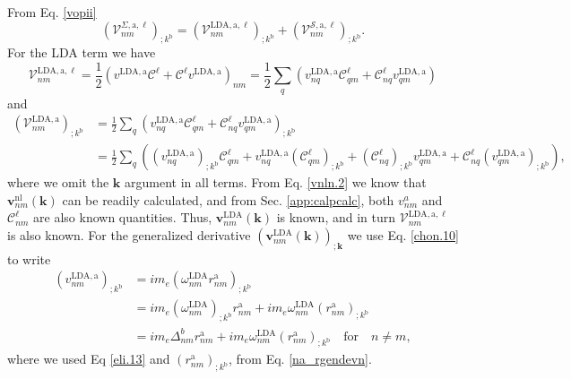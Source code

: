 From Eq. \eqref{vopii}
\begin{equation}\label{a.1}
\left(\mathcal{V}^{\Sigma,\mathrm{a},\ell}_{nm}\right)_{;k^\mathrm{b}}
= \left(\mathcal{V}^{\mathrm{LDA},\mathrm{a},\ell}_{nm}\right)_{;k^\mathrm{b}}
+ \left(\mathcal{V}^{{\mathcal{S}},\mathrm{a},\ell}_{nm}\right)_{;k^\mathrm{b}}.
\end{equation} 
For the LDA term we have
\begin{equation}\label{a.2}
\mathcal{V}^{\mathrm{LDA},\mathrm{a},\ell}_{nm}
= \frac{1}{2}
\left(v^{\mathrm{LDA},\mathrm{a}}\mathcal{C}^{\ell}
      + \mathcal{C}^{\ell} v^{\mathrm{LDA},\mathrm{a}}\right)_{nm} 
= \frac{1}{2}\sum_{q}
\left(
  v^{\mathrm{LDA},\mathrm{a}}_{nq}\mathcal{C}^{\ell}_{qm}
+ \mathcal{C}^{\ell}_{nq} v^{\mathrm{LDA},\mathrm{a}}_{qm}
\right)
\end{equation}
and
\begin{align}\label{a.2a}
\left(\mathcal{V}^{\mathrm{LDA},\mathrm{a}}_{nm}\right)_{;k^\mathrm{b}}
&= \frac{1}{2}\sum_{q}\left(  
  v^{\mathrm{LDA},\mathrm{a}}_{nq}\mathcal{C}^{\ell}_{qm}
+ \mathcal{C}^{\ell}_{nq}v^{\mathrm{LDA},\mathrm{a}}_{qm}
\right)_{;k^\mathrm{b}}\nonumber\\
&= \frac{1}{2}\sum_{q}\left(
  (v^{\mathrm{LDA},\mathrm{a}}_{nq})_{;k^\mathrm{b}}\mathcal{C}^{\ell}_{qm}
+  v^{\mathrm{LDA},\mathrm{a}}_{nq}(\mathcal{C}^{\ell}_{qm})_{;k^\mathrm{b}}
+ (\mathcal{C}^{\ell}_{nq})_{;k^\mathrm{b}} v^{\mathrm{LDA},\mathrm{a}}_{qm}
+ \mathcal{C}^{\ell}_{nq} (v^{\mathrm{LDA},\mathrm{a}}_{qm})_{;k^\mathrm{b}}
\right),
\end{align}   
where we omit the $\mathbf{k}$ argument in all terms. From Eq. \eqref{vnln.2} we
know that $\mathbf{v}^\mathrm{nl}_{nm}(\mathbf{k})$ can be readily calculated,
and from Sec. \ref{app:calpcalc}, both $v^{a}_{nm}$ and $\mathcal{C}_{nm}^{\ell}$
are also known quantities. Thus, $\mathbf{v}^\mathrm{LDA}_{nm}(\mathbf{k})$ is
known, and in turn $\mathcal{V}^{\mathrm{LDA},\mathrm{a},\ell}_{nm}$ is also
known. For the generalized derivative
$(\mathbf{v}^\mathrm{LDA}_{nm}(\mathbf{k}))_{;\mathbf{k}}$ we use Eq.
\eqref{chon.10} to write
\begin{align}\label{a.3}
(v^{\mathrm{LDA},\mathrm{a}}_{nm})_{;k^\mathrm{b}}
&= im_{e}(\omega^\mathrm{LDA}_{nm}r^\mathrm{a}_{nm})_{;k^\mathrm{b}}\nonumber\\
&= im_{e}(\omega^\mathrm{LDA}_{nm})_{;k^\mathrm{b}} r^\mathrm{a}_{nm}
 + im_{e}\omega^\mathrm{LDA}_{nm}(r^\mathrm{a}_{nm})_{;k^\mathrm{b}}\nonumber\\
&= im_{e}\Delta^b_{nm}r^\mathrm{a}_{nm}
 + im_{e}\omega^\mathrm{LDA}_{nm}(r^\mathrm{a}_{nm})_{;k^\mathrm{b}}
   \quad\mathrm{for}\quad n\ne m,
\end{align} 
where we used Eq \eqref{eli.13} and $(r^\mathrm{a}_{nm})_{;k^\mathrm{b}}$, from
Eq. \eqref{na_rgendevn}.


